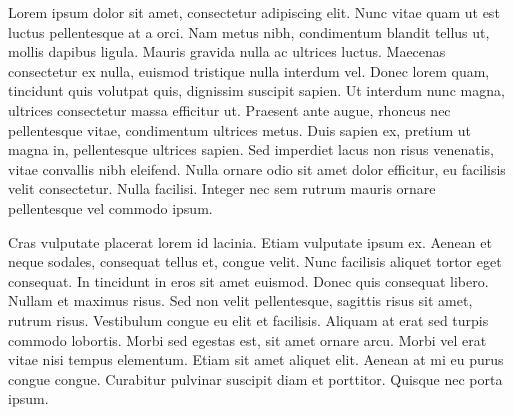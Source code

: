 \documentclass[11pt]{scrreprt}
\begin{document}
Lorem ipsum dolor sit amet, consectetur adipiscing elit. Nunc vitae quam ut est luctus pellentesque at a orci. Nam metus nibh, condimentum blandit tellus ut, mollis dapibus ligula. Mauris gravida nulla ac ultrices luctus. Maecenas consectetur ex nulla, euismod tristique nulla interdum vel. Donec lorem quam, tincidunt quis volutpat quis, dignissim suscipit sapien. Ut interdum nunc magna, ultrices consectetur massa efficitur ut. Praesent ante augue, rhoncus nec pellentesque vitae, condimentum ultrices metus. Duis sapien ex, pretium ut magna in, pellentesque ultrices sapien. Sed imperdiet lacus non risus venenatis, vitae convallis nibh eleifend. Nulla ornare odio sit amet dolor efficitur, eu facilisis velit consectetur. Nulla facilisi. Integer nec sem rutrum mauris ornare pellentesque vel commodo ipsum.

Cras vulputate placerat lorem id lacinia. Etiam vulputate ipsum ex. Aenean et neque sodales, consequat tellus et, congue velit. Nunc facilisis aliquet tortor eget consequat. In tincidunt in eros sit amet euismod. Donec quis consequat libero. Nullam et maximus risus. Sed non velit pellentesque, sagittis risus sit amet, rutrum risus. Vestibulum congue eu elit et facilisis. Aliquam at erat sed turpis commodo lobortis. Morbi sed egestas est, sit amet ornare arcu. Morbi vel erat vitae nisi tempus elementum. Etiam sit amet aliquet elit. Aenean at mi eu purus congue congue. Curabitur pulvinar suscipit diam et porttitor. Quisque nec porta ipsum. 
\end{document}
